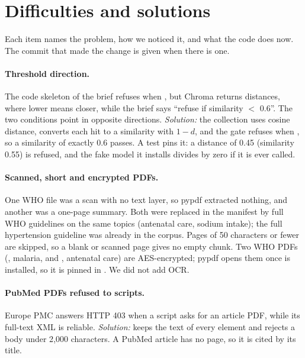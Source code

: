 \section{Difficulties and solutions}
\label{sec:difficulties}

Each item names the problem, how we noticed it, and what the code does now. The commit that made the
change is given when there is one.

\paragraph{Threshold direction.}
The code skeleton of the brief refuses when , but Chroma returns distances,
where lower means closer, while the brief says ``refuse if similarity $<$ 0.6''. The two conditions
point in opposite directions. \emph{Solution:} the collection uses cosine distance, 
converts each hit to a similarity with $1 - d$, and the gate refuses when ,
so a similarity of exactly 0.6 passes. A test pins it: a distance of 0.45 (similarity 0.55) is
refused, and the fake model it installs divides by zero if it is ever called.

\paragraph{Scanned, short and encrypted PDFs.}
One WHO file was a scan with no text layer, so pypdf extracted nothing, and another was a one-page
summary. Both were replaced in the manifest by full WHO guidelines on the same topics (antenatal
care, sodium intake); the full hypertension guideline was already in the corpus. Pages of 50
characters or fewer are skipped, so a blank or scanned page gives no empty chunk. Two WHO PDFs
(, malaria, and , antenatal care) are AES-encrypted; pypdf opens them once
 is installed, so it is pinned in . We did not add OCR.

\paragraph{PubMed PDFs refused to scripts.}
Europe PMC answers HTTP 403 when a script asks for an article PDF, while its full-text XML is
reliable. \emph{Solution:}  keeps the text of every  element and
rejects a body under 2{,}000 characters. A PubMed article has no page, so it is cited by its title.

